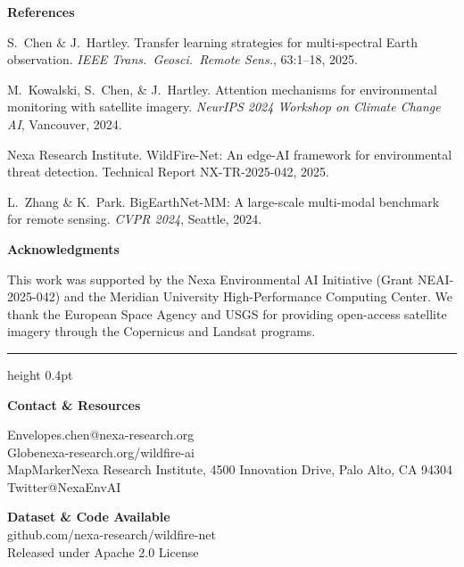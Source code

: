 \documentclass[10pt]{article}
\newlength{\panelwidth}
\newcommand{\subheading}[1]{%
  \medskip
  {\color{secondary}\bfseries\small #1}
  \smallskip
}
\newcommand{\contactline}[2]{%
  {\footnotesize\color{darktext}#1\hspace{4pt}#2}\\[2pt]
}
\newcommand{\smallsep}{\vspace{6pt}}
\begin{document}
\begin{minipage}[t]{\panelwidth}
  \smallsep

  \subheading{References}

  {\scriptsize\color{darktext}
  \begin{enumerate}[leftmargin=14pt,label={[\arabic*]},itemsep=0pt]
    \item S.\ Chen \& J.\ Hartley. Transfer learning strategies
      for multi-spectral Earth observation. \textit{IEEE Trans.\
      Geosci.\ Remote Sens.}, 63:1--18, 2025.
    \item M.\ Kowalski, S.\ Chen, \& J.\ Hartley. Attention
      mechanisms for environmental monitoring with satellite
      imagery. \textit{NeurIPS 2024 Workshop on Climate Change
      AI}, Vancouver, 2024.
    \item Nexa Research Institute. WildFire-Net: An edge-AI
      framework for environmental threat detection. Technical
      Report NX-TR-2025-042, 2025.
    \item L.\ Zhang \& K.\ Park. BigEarthNet-MM: A large-scale
      multi-modal benchmark for remote sensing. \textit{CVPR
      2024}, Seattle, 2024.
  \end{enumerate}
  }

  \smallsep

  \subheading{Acknowledgments}

  {\footnotesize\color{darktext}
  This work was supported by the Nexa Environmental AI
  Initiative (Grant NEAI-2025-042) and the Meridian University
  High-Performance Computing Center. We thank the European
  Space Agency and USGS for providing open-access satellite
  imagery through the Copernicus and Landsat programs.}

  \smallsep

  {\color{primary}\hrule height 0.4pt}
  \vspace{6pt}

  \subheading{Contact \& Resources}

  \vspace{2pt}

  \contactline{Envelope}{s.chen@nexa-research.org}
  \contactline{Globe}{nexa-research.org/wildfire-ai}
  \contactline{MapMarker}{Nexa Research Institute, 4500
    Innovation Drive, Palo Alto, CA 94304}
  \contactline{Twitter}{@NexaEnvAI}

  \vspace{8pt}

  \begin{highlightbox}
    {\footnotesize\bfseries\color{primary}
    Dataset \& Code Available}\\[1pt]
    {\scriptsize\color{softgray}
    github.com/nexa-research/wildfire-net\\
    Released under Apache 2.0 License}
  \end{highlightbox}

\end{minipage}
\end{document}
